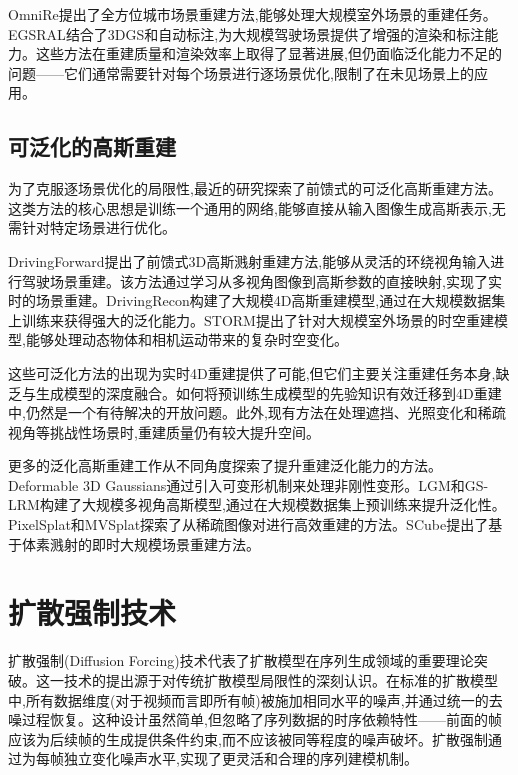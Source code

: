 OmniRe\cite{chen2024omnire}提出了全方位城市场景重建方法,能够处理大规模室外场景的重建任务。EGSRAL\cite{huo2025egsral}结合了3DGS和自动标注,为大规模驾驶场景提供了增强的渲染和标注能力。这些方法在重建质量和渲染效率上取得了显著进展,但仍面临泛化能力不足的问题——它们通常需要针对每个场景进行逐场景优化,限制了在未见场景上的应用。

\subsection{可泛化的高斯重建}

为了克服逐场景优化的局限性,最近的研究\cite{tian2024drivingforward,lu2024drivingrecon,yang2024storm}探索了前馈式的可泛化高斯重建方法。这类方法的核心思想是训练一个通用的网络,能够直接从输入图像生成高斯表示,无需针对特定场景进行优化。

DrivingForward\cite{tian2024drivingforward}提出了前馈式3D高斯溅射重建方法,能够从灵活的环绕视角输入进行驾驶场景重建。该方法通过学习从多视角图像到高斯参数的直接映射,实现了实时的场景重建。DrivingRecon\cite{lu2024drivingrecon}构建了大规模4D高斯重建模型,通过在大规模数据集上训练来获得强大的泛化能力。STORM\cite{yang2024storm}提出了针对大规模室外场景的时空重建模型,能够处理动态物体和相机运动带来的复杂时空变化。

这些可泛化方法的出现为实时4D重建提供了可能,但它们主要关注重建任务本身,缺乏与生成模型的深度融合。如何将预训练生成模型的先验知识有效迁移到4D重建中,仍然是一个有待解决的开放问题。此外,现有方法在处理遮挡、光照变化和稀疏视角等挑战性场景时,重建质量仍有较大提升空间。

更多的泛化高斯重建工作\cite{yang2023deformable,tang2024lgm,zhang2024gslrm,charatan2024pixelsplat,chen2024mvsplat,ren2024scube}从不同角度探索了提升重建泛化能力的方法。Deformable 3D Gaussians\cite{yang2023deformable}通过引入可变形机制来处理非刚性变形。LGM\cite{tang2024lgm}和GS-LRM\cite{zhang2024gslrm}构建了大规模多视角高斯模型,通过在大规模数据集上预训练来提升泛化性。PixelSplat\cite{charatan2024pixelsplat}和MVSplat\cite{chen2024mvsplat}探索了从稀疏图像对进行高效重建的方法。SCube\cite{ren2024scube}提出了基于体素溅射的即时大规模场景重建方法。

\section{扩散强制技术}

扩散强制(Diffusion Forcing)技术代表了扩散模型在序列生成领域的重要理论突破。这一技术的提出源于对传统扩散模型局限性的深刻认识。在标准的扩散模型中,所有数据维度(对于视频而言即所有帧)被施加相同水平的噪声,并通过统一的去噪过程恢复。这种设计虽然简单,但忽略了序列数据的时序依赖特性——前面的帧应该为后续帧的生成提供条件约束,而不应该被同等程度的噪声破坏。扩散强制通过为每帧独立变化噪声水平,实现了更灵活和合理的序列建模机制。


